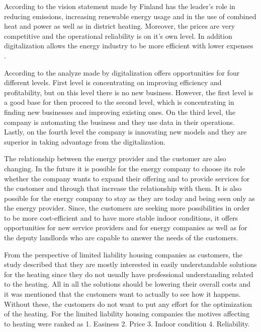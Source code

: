 According to the vision statement made by \textcite{Energiateollisuus:2018} Finland has the leader's role in reducing emissions, increasing renewable energy usage and in the use of combined heat and power as well as in district heating. Moreover, the prices are very competitive and the operational reliability is on it's own level. In addition digitalization allows the energy industry to be more efficient with lower expenses \parencite{Tekes:2017}.

According to the analyze made by \textcite{Deloitte} digitalization offers opportunities for four different levels. First level is concentrating on improving efficiency and profitability, but on this level there is no new business. However, the first level is a good base for then proceed to the second level, which is concentrating in finding new businesses and improving existing ones. On the third level, the company is automating the business and they use data in their operations. Lastly, on the fourth level the company is innovating new models and they are superior in taking advantage from the digitalization.

The relationship between the energy provider and the customer are also changing. In the future it is possible for the energy company to choose its role whether the company wants to expand their offering and to provide services for the customer and through that increase the relationship with them. It is also possible for the energy company to stay as they are today and being seen only as the energy provider. Since, the customers are seeking more possibilities in order to be more cost-efficient and to have more stable indoor conditions, it offers opportunities for new service providers and for energy companies as well as for the deputy landlords who are capable to answer the needs of the customers. \parencite{Deloitte}

From the perspective of limited liability housing companies as customers, the study \parencite{Deloitte} described that they are mostly interested in easily understandable solutions for the heating since they do not usually have professional understanding related to the heating. All in all the solutions should be lowering their overall costs and it was mentioned that the customers want to actually to see how it happens. Without these, the customers do not want to put any effort for the optimization of the heating. For the limited liability housing companies the motives affecting to heating were ranked as 1. Easiness 2. Price 3. Indoor condition 4. Reliability.

